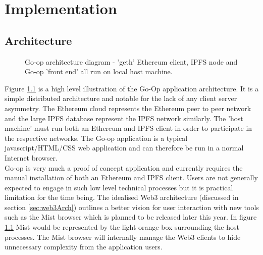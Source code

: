 
\chapter{Implementation} %

\label{Implementation} %

\section{Architecture}
\begin{figure}
\centering
{}
\decoRule
\caption[Go-op Architecture Diagram]{Go-op architecture diagram - 'geth' Ethereum client, IPFS node and Go-op 'front end' all run on local host machine.}
\label{fig:GoopArch}
\end{figure}

Figure \ref{fig:GoopArch} is a high level illustration of the Go-Op application architecture. It is a simple distributed architecture and notable for the lack of any client server asymmetry. The Ethereum cloud represents the Ethereum peer to peer network and the large IPFS database represent the IPFS network similarly. The 'host machine' must run both an Ethereum and IPFS client in order to participate in the respective networks. The Go-op application is a typical javascript/HTML/CSS web application and can therefore be run in a normal Internet browser. \\

Go-op is very much a proof of concept application and currently requires the manual installation of both an Ethereum and IPFS client. Users are not generally expected to engage in such low level technical processes but it is practical limitation for the time being. The idealised Web3 architecture (discussed in section \ref{sec:web3Arch}) outlines a better vision for user interaction with new tools such as the Mist browser which is planned to be released later this year. In figure \ref{fig:GoopArch} Mist would be represented by the light orange box surrounding the host processes. The Mist browser will internally manage the Web3 clients to hide unnecessary complexity from the application users. \\

